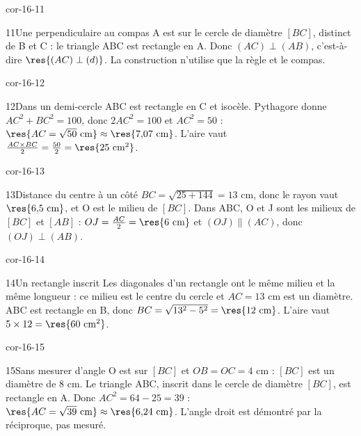 \begin{blocLivre}{cor-16-11}\begin{corrige}{11}{Une perpendiculaire au compas}
A est sur le cercle de diamètre $[BC]$, distinct de B et C : le triangle ABC est rectangle en A. Donc $(AC)\perp(AB)$, c’est-à-dire $\res{(AC)\perp(d)}$. La construction n’utilise que la règle et le compas.
\label{fig-cor-16-11}
\end{corrige}\end{blocLivre}
\begin{blocLivre}{cor-16-12}\begin{corrige}{12}{Dans un demi-cercle}
ABC est rectangle en C et isocèle. Pythagore donne $AC^2+BC^2=100$, donc $2AC^2=100$ et $AC^2=50$ : $\res{AC=\sqrt{50}\ \mathrm{cm}}\approx\res{7{,}07\ \mathrm{cm}}$. L’aire vaut $\frac{AC\times BC}2=\frac{50}2=\res{25\ \mathrm{cm}^2}$.
\label{fig-cor-16-12}
\end{corrige}\end{blocLivre}
\begin{blocLivre}{cor-16-13}\begin{corrige}{13}{Distance du centre à un côté}
$BC=\sqrt{25+144}=13$ cm, donc le rayon vaut $\res{6{,}5\ \mathrm{cm}}$, et O est le milieu de $[BC]$. Dans ABC, O et J sont les milieux de $[BC]$ et $[AB]$ : $OJ=\frac{AC}2=\res{6\ \mathrm{cm}}$ et $(OJ)\parallel(AC)$, donc $(OJ)\perp(AB)$.
\label{fig-cor-16-13}
\end{corrige}\end{blocLivre}
\begin{blocLivre}{cor-16-14}\begin{corrige}{14}{Un rectangle inscrit}
Les diagonales d’un rectangle ont le même milieu et la même longueur : ce milieu est le centre du cercle et $AC=13$ cm est un diamètre. ABC est rectangle en B, donc $BC=\sqrt{13^2-5^2}=\res{12\ \mathrm{cm}}$. L’aire vaut $5\times12=\res{60\ \mathrm{cm}^2}$.
\label{fig-cor-16-14}
\end{corrige}\end{blocLivre}
\begin{blocLivre}{cor-16-15}\begin{corrige}{15}{Sans mesurer d’angle}
O est sur $[BC]$ et $OB=OC=4$ cm : $[BC]$ est un diamètre de 8 cm. Le triangle ABC, inscrit dans le cercle de diamètre $[BC]$, est rectangle en A. Donc $AC^2=64-25=39$ : $\res{AC=\sqrt{39}\ \mathrm{cm}}\approx\res{6{,}24\ \mathrm{cm}}$. L’angle droit est démontré par la réciproque, pas mesuré.
\label{fig-cor-16-15}
\end{corrige}\end{blocLivre}
